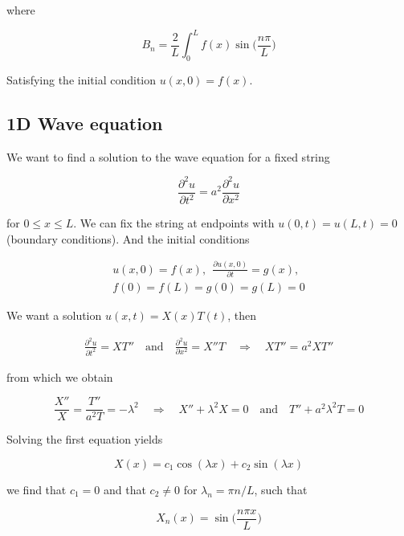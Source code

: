\documentclass[a4paper]{article}
\begin{document}
where

\begin{equation*}
    B_n=\frac{2}{L}\int_{0}^{L}f(x)\sin\bigg(\frac{n\pi}{L}\bigg)
\end{equation*}

Satisfying the initial condition $u(x, 0)=f(x)$.

\subsection{1D Wave equation}

We want to find a solution to the wave equation for a fixed string

\begin{equation*}
    \frac{\partial^2 u}{\partial t^2}=a^2\frac{\partial^2 u}{\partial x^2}
\end{equation*}

for $0\le x\le L$. We can fix the string at endpoints with $u(0, t)=u(L, t)=0$ (boundary conditions). And the initial conditions

\begin{align*}
    u(x, 0)=f(x), \ \ \frac{\partial u(x, 0)}{\partial t}=g(x),\\[1em]
    f(0)=f(L)=g(0)=g(L)=0
\end{align*}

We want a solution $u(x, t)=X(x)T(t)$, then

\begin{align*}
    \frac{\partial^2 u}{\partial t^2}=XT''\quad\text{and}\quad \frac{\partial^2 u}{\partial x^2}=X''T\quad\Rightarrow\quad XT''=a^2XT''
\end{align*}

from which we obtain

\begin{equation*}
    \frac{X''}{X}=\frac{T''}{a^2T}=-\lambda^2\quad\Rightarrow\quad X''+\lambda^2X=0\quad\text{and}\quad T''+a^2\lambda^2T=0
\end{equation*}

Solving the first equation yields 

\begin{equation*}
    X(x)=c_1\cos(\lambda x)+c_2\sin(\lambda x)
\end{equation*}

we find that $c_1=0$ and that $c_2\not=0$ for $\lambda_n=\pi n/L$, such that

\begin{equation*}
    X_n(x)=\sin\bigg(\frac{n\pi x}{L}\bigg)
\end{equation*}
\end{document}
